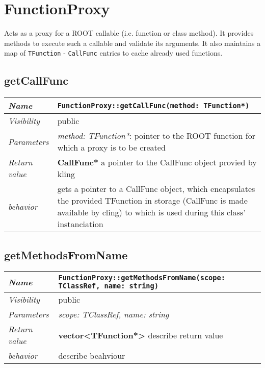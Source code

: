 \chapter{FunctionProxy}
	Acts as a proxy for a ROOT callable (i.e. function or class method). It provides methods to execute such a callable and validate its arguments. It also maintains a map of \texttt{TFunction} - \texttt{CallFunc} entries to cache already used functions.

\section{getCallFunc}
\begin{longtable}{p{3cm} @{\hskip 1cm} p{12cm}}
	\hline

	\textit{Name} & \texttt{FunctionProxy::getCallFunc(method: TFunction*)}\\
	\hline

	\textit{Visibility} & public\\
	\hline

	\textit{Parameters} &  \textit{method: TFunction*}: pointer to the ROOT function for which a proxy 
							is to be created\\
	\hline

	\textit{Return value} & \textbf{CallFunc*} a pointer to the CallFunc object provied by kling\\
	\hline

	\textit{behavior} & gets a pointer to a CallFunc object, which encapsulates the provided TFunction 
			in storage (CallFunc is made available by cling)  to which is used during this class' instanciation\\
	\hline

\end{longtable} \pagebreak

\section{getMethodsFromName}
\begin{longtable}{p{3cm} @{\hskip 1cm} p{12cm}}
	\hline

	\textit{Name} & \texttt{FunctionProxy::getMethodsFromName(scope: TClassRef, name: string)}\\
	\hline

	\textit{Visibility} & public\\
	\hline

	\textit{Parameters} & \textit{scope: TClassRef, name: string}\\
	\hline

	\textit{Return value} & \textbf{ vector<TFunction*>} describe return value\\
	\hline

	\textit{behavior} & describe beahviour \\
	\hline

\end{longtable} \pagebreak


